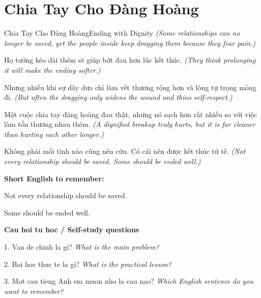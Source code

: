 \section{Chia Tay Cho Đàng Hoàng}
\begin{truyen}{Chia Tay Cho Đàng Hoàng}{Ending with Dignity}
\textit{(Some relationships can no longer be saved, yet the people inside keep dragging them because they fear pain.)}

Họ tưởng kéo dài thêm sẽ giúp bớt đau hơn lúc kết thúc.
\textit{(They think prolonging it will make the ending softer.)}

Nhưng nhiều khi sự dây dưa chỉ làm vết thương rộng hơn và lòng tự trọng mỏng đi.
\textit{(But often the dragging only widens the wound and thins self-respect.)}

Một cuộc chia tay đàng hoàng đau thật, nhưng nó sạch hơn rất nhiều so với việc làm tổn thương nhau thêm.
\textit{(A dignified breakup truly hurts, but it is far cleaner than hurting each other longer.)}

\end{truyen}

\begin{baihoc}
Không phải mối tình nào cũng nên cứu. Có cái nên được kết thúc tử tế.
\textit{(Not every relationship should be saved. Some should be ended well.)}
\end{baihoc}

\begin{ghinhoanh}
\textbf{Short English to remember:}

Not every relationship should be saved.

Some should be ended well.

\end{ghinhoanh}

\begin{tuhocnhanh}
\textbf{Cau hoi tu hoc / Self-study questions}

1. Van de chinh la gi? \textit{What is the main problem?}

2. Bai hoc thuc te la gi? \textit{What is the practical lesson?}

3. Mot cau tieng Anh em muon nho la cau nao? \textit{Which English sentence do you want to remember?}
\end{tuhocnhanh}
\ngancach

